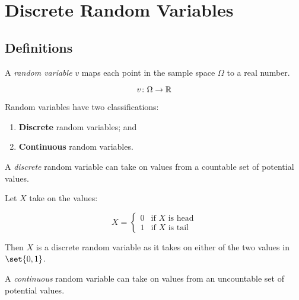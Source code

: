 \section{Discrete Random Variables}

\subsection{Definitions}

\begin{definition}
    A \textit{random variable} $v$ maps each point in the sample space $\Omega$
    to a real number.

    \begin{equation}
        v \colon \Omega \to \mathbb{R}
    \end{equation}

    Random variables have two classifications:

    \begin{enumerate}
        \item \textbf{Discrete} random variables; and
        \item \textbf{Continuous} random variables.
    \end{enumerate}
\end{definition}

\begin{definition}
    A \textit{discrete} random variable can take on values from a countable set
    of potential values.
\end{definition}

\begin{example}
    Let $X$ take on the values:

    \begin{equation*}
        X =
        \begin{cases}
            0 & \text{if $X$ is head} \\
            1 & \text{if $X$ is tail}
        \end{cases}
    \end{equation*}

    Then $X$ is a discrete random variable as it takes on either of the two
    values in $\set{0, 1}$.
\end{example}

\begin{definition}
    A \textit{continuous} random variable can take on values from an
    uncountable set of potential values.
\end{definition}

